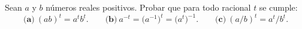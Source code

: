     \item* Sean $a$ y $b$ números reales positivos. Probar que para todo racional $t$ se cumple:
    \[
        \textbf{(a)}\ (ab)^t = a^tb^t.
        \qquad
        \textbf{(b)}\ a^{-t} = \big(a^{-1}\big)^t = \big(a^t\big)^{-1}.
        \qquad
        \textbf{(c)}\ (a/b)^t = a^t/b^t.
    \]

